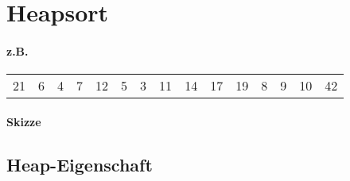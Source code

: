 \section{Heapsort}
\paragraph{z.B.} \begin{tabular}{ccccccccccccccc}
	21&6&4&7&12&5&3&11&14&17&19&8&9&10&42
\end{tabular}
\paragraph{Skizze}
\subsection{Heap-Eigenschaft}
